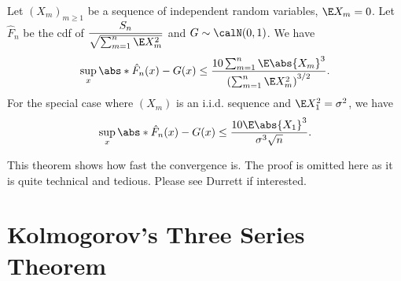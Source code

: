 \documentclass[../aipt.tex]{subfiles}
\begin{document}
%
\begin{Theorem}
Let $(X_m)_{m\geq1}$ be a sequence of independent random variables, $\E X_m = 0$. Let $\hat{F}_n$ be the cdf of $\dfrac{S_n}{\sqrt{\sum_{m=1}^n \E X_m^2}}$ and $G \sim \calN (0, 1)$. We have
\begin{align*}
\sup_x \abs*{\hat{F}_n(x) - G(x)} \leq \frac{10 \sum_{m=1}^n \E \abs{X_m}^3}{\left(\sum_{m=1}^n \E X_m^2\right)^{3/2}}.
\end{align*}
%
For the special case where $(X_m)$ is an i.i.d. sequence and $\E X_1^2 = \sigma^2$, we have
\begin{align*}
\sup_x \abs*{\hat{F}_n(x) - G(x)} \leq \frac{10 \E \abs{X_1}^3}{\sigma^3 \sqrt{n}}.
\end{align*}
\end{Theorem}
This theorem shows how fast the convergence is. The proof is omitted here as it is quite technical and tedious. Please see Durrett if interested. 

\section{Kolmogorov's Three Series Theorem}
\end{document}
